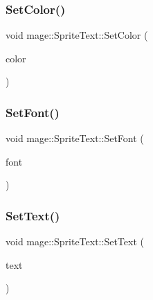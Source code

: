 \hypertarget{classmage_1_1_sprite_text_ab3930318d6dca0589de4490ed629a3b8}{}\label{classmage_1_1_sprite_text_ab3930318d6dca0589de4490ed629a3b8} 
\subsubsection{\texorpdfstring{Set\+Color()}{SetColor()}\hspace{0.1cm}{\footnotesize\ttfamily [2/2]}}
{\footnotesize\ttfamily void mage\+::\+Sprite\+Text\+::\+Set\+Color (\begin{DoxyParamCaption}\item[{const X\+M\+V\+E\+C\+T\+OR \&}]{color }\end{DoxyParamCaption})}

\hypertarget{classmage_1_1_sprite_text_a8e753dcd210b1fdf9c5399a9f0f3415d}{}\label{classmage_1_1_sprite_text_a8e753dcd210b1fdf9c5399a9f0f3415d} 
\subsubsection{\texorpdfstring{Set\+Font()}{SetFont()}}
{\footnotesize\ttfamily void mage\+::\+Sprite\+Text\+::\+Set\+Font (\begin{DoxyParamCaption}\item[{\hyperlink{namespacemage_a1e01ae66713838a7a67d30e44c67703e}{Shared\+Ptr}$<$ \hyperlink{classmage_1_1_sprite_font}{Sprite\+Font} $>$}]{font }\end{DoxyParamCaption})}

\hypertarget{classmage_1_1_sprite_text_ac33e512ab29554a306ada9a378ab00eb}{}\label{classmage_1_1_sprite_text_ac33e512ab29554a306ada9a378ab00eb} 
\subsubsection{\texorpdfstring{Set\+Text()}{SetText()}\hspace{0.1cm}{\footnotesize\ttfamily [1/3]}}
{\footnotesize\ttfamily void mage\+::\+Sprite\+Text\+::\+Set\+Text (\begin{DoxyParamCaption}\item[{const wstring \&}]{text }\end{DoxyParamCaption})}

